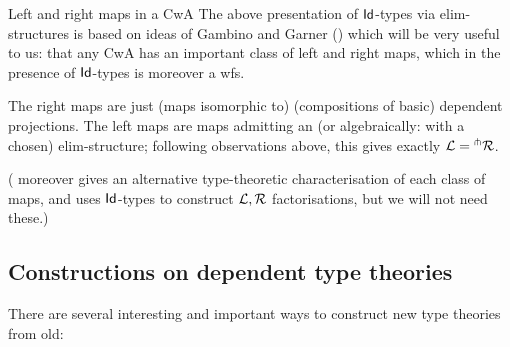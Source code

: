 \begin{para}{Left and right maps in a CwA} \label{subsec:left-right-in-CwA}
The above presentation of $\mathsf{Id}$-types via elim-structures is based on ideas of Gambino and Garner (\cite{gambino-garner}) which will be very useful to us: that any CwA has an important class of left and right maps, which in the presence of $\mathsf{Id}$-types is moreover a wfs.

The right maps are just (maps isomorphic to) (compositions of basic) dependent projections.  The left maps are maps admitting an (or algebraically: with a chosen) elim-structure; following observations above, this gives exactly $\mathcal{L} = {}^\pitchfork \mathcal{R}$.  

(\cite{gambino-garner} moreover gives an alternative type-theoretic characterisation of each class of maps, and uses $\mathsf{Id}$-types to construct $\mathcal{L},\mathcal{R}$ factorisations, but we will not need these.)



\end{para}


\subsection{Constructions on dependent type theories}

There are several interesting and important ways to construct new type theories from old:


